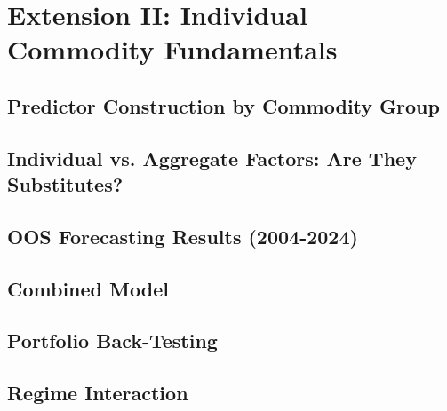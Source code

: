 
\section{Extension II: Individual Commodity Fundamentals}
\subsection{Predictor Construction by Commodity Group}
\subsection{Individual vs. Aggregate Factors: Are They Substitutes?}
\subsection{OOS Forecasting Results (2004-2024)}
\subsection{Combined Model}
\subsection{Portfolio Back-Testing}
\subsection{Regime Interaction}